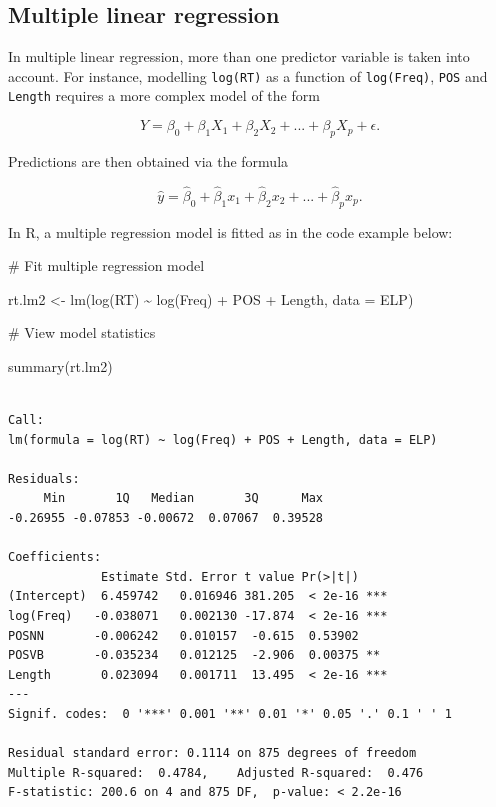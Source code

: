 \documentclass[
  11pt,
  letterpaper,
  DIV=11,
  numbers=noendperiod]{scrreprt}
\newenvironment{Shaded}{\begin{snugshade}}{\end{snugshade}}
\newcommand{\AttributeTok}[1]{\textcolor[rgb]{0.40,0.45,0.13}{#1}}
\newcommand{\CommentTok}[1]{\textcolor[rgb]{0.37,0.37,0.37}{#1}}
\newcommand{\FunctionTok}[1]{\textcolor[rgb]{0.28,0.35,0.67}{#1}}
\newcommand{\NormalTok}[1]{\textcolor[rgb]{0.00,0.23,0.31}{#1}}
\newcommand{\OtherTok}[1]{\textcolor[rgb]{0.00,0.23,0.31}{#1}}
\newcommand{\SpecialCharTok}[1]{\textcolor[rgb]{0.37,0.37,0.37}{#1}}
\begin{document}
\subsection{Multiple linear
regression}\label{multiple-linear-regression}

In multiple linear regression, more than one predictor variable is taken
into account. For instance, modelling \texttt{log(RT)} as a function of
\texttt{log(Freq)}, \texttt{POS} and \texttt{Length} requires a more
complex model of the form

\[ Y = \beta_0 + \beta_1X_1 + \beta_2X_2 + ... + \beta_pX_p + \epsilon.\]

Predictions are then obtained via the formula

\[\hat{y} = \hat{\beta}_0 + \hat{\beta}_1x_1 + \hat{\beta}_2x_2 + ... + \hat{\beta}_px_p.
\]

In R, a multiple regression model is fitted as in the code example
below:

\begin{Shaded}
\begin{Highlighting}[]
\CommentTok{\# Fit multiple regression model}

\NormalTok{rt.lm2 }\OtherTok{\textless{}{-}} \FunctionTok{lm}\NormalTok{(}\FunctionTok{log}\NormalTok{(RT) }\SpecialCharTok{\textasciitilde{}} \FunctionTok{log}\NormalTok{(Freq) }\SpecialCharTok{+}\NormalTok{ POS }\SpecialCharTok{+}\NormalTok{ Length, }\AttributeTok{data =}\NormalTok{ ELP)}

\CommentTok{\# View model statistics}

\FunctionTok{summary}\NormalTok{(rt.lm2)}
\end{Highlighting}
\end{Shaded}

\begin{verbatim}

Call:
lm(formula = log(RT) ~ log(Freq) + POS + Length, data = ELP)

Residuals:
     Min       1Q   Median       3Q      Max 
-0.26955 -0.07853 -0.00672  0.07067  0.39528 

Coefficients:
             Estimate Std. Error t value Pr(>|t|)    
(Intercept)  6.459742   0.016946 381.205  < 2e-16 ***
log(Freq)   -0.038071   0.002130 -17.874  < 2e-16 ***
POSNN       -0.006242   0.010157  -0.615  0.53902    
POSVB       -0.035234   0.012125  -2.906  0.00375 ** 
Length       0.023094   0.001711  13.495  < 2e-16 ***
---
Signif. codes:  0 '***' 0.001 '**' 0.01 '*' 0.05 '.' 0.1 ' ' 1

Residual standard error: 0.1114 on 875 degrees of freedom
Multiple R-squared:  0.4784,    Adjusted R-squared:  0.476 
F-statistic: 200.6 on 4 and 875 DF,  p-value: < 2.2e-16
\end{verbatim}
\end{document}

